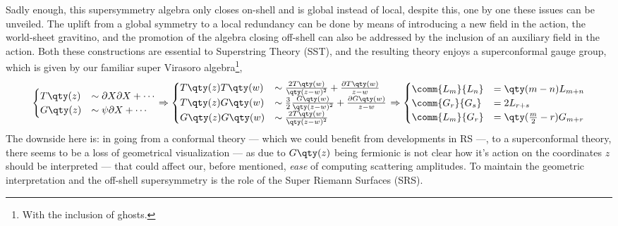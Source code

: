 Sadly enough, this supersymmetry algebra only closes on-shell and is global instead of local, despite this, 
one by one these issues can be unveiled. The uplift from a global symmetry to a local redundancy can be 
done by means of introducing a new field in the action, the world-sheet gravitino, and the promotion of the 
algebra closing off-shell can also be addressed by the inclusion of an auxiliary field in the action. Both 
these constructions are essential to Superstring Theory (SST), and the resulting theory enjoys a superconformal gauge 
group, which is given by our familiar super Virasoro algebra\footnote{With the inclusion of ghosts.},
\begin{align*}
    \begin{cases}
        T\qty(z)&\sim\partial X\partial X+\cdots\\
        G\qty(z)&\sim\psi\partial X+\cdots
    \end{cases}\Rightarrow
    \begin{cases}
    T\qty(z)T\qty(w)&\sim\frac{2T\qty(w)}{\qty(z-w)^2}+\frac{\partial T\qty(w)}{z-w}\\
    T\qty(z)G\qty(w)&\sim\frac32\frac{G\qty(w)}{\qty(z-w)^2}+\frac{\partial G\qty(w)}{z-w}\\
    G\qty(z)G\qty(w)&\sim\frac{2T\qty(w)}{\qty(z-w)^2}\end{cases}\Rightarrow\begin{cases}
        \comm{L_m}{L_n}&=\qty(m-n)L_{m+n}\\
        \comm{G_r}{G_s}&=2L_{r+s}\\
        \comm{L_m}{G_r}&=\qty(\frac m2-r)G_{m+r}
    \end{cases}
\end{align*}
The downside here is: in going from a conformal theory --- which we could benefit from developments in RS ---, 
to a superconformal theory, there seems to be a loss of geometrical visualization --- as due to $G\qty(z)$ 
being fermionic is not clear how it's action on the coordinates $z$ should be interpreted --- that could affect our, before 
mentioned, \textit{ease} of computing scattering amplitudes. To maintain the geometric interpretation and 
the off-shell supersymmetry is the role of the Super Riemann Surfaces (SRS).